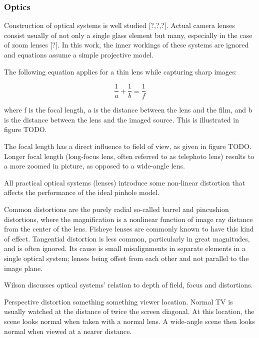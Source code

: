 \subsubsection{Optics}

Construction of optical systems is well studied [?,?,?]. Actual camera lenses consist usually of not only a single glass element but many, especially in the case of zoom lenses [?]. In this work, the inner workings of these systems are ignored and equations assume a simple projective model.

The following equation applies for a thin lens while capturing sharp images:

\begin{equation}
	\frac{1}{a} + \frac{1}{b} = \frac{1}{f} \label{eq:focal}
\end{equation}

where f is the focal length, a is the distance between the lens and the film, and b is the distance between the lens and the imaged source. This is illustrated in figure TODO.

The focal length has a direct influence to field of view, as given in figure TODO. Longer focal length (long-focus lens, often referred to as telephoto lens) results to a more zoomed in picture, as opposed to a wide-angle lens. 

All practical optical systems (lenses) introduce some non-linear distortion that affects the performance of the ideal pinhole model.

Common distortions are the purely radial so-called barrel and pincushion distortions, where the magnification is a nonlinear function of image ray distance from the center of the lens.
Fisheye lenses are commonly known to have this kind of effect.
Tangential distortion is less common, particularly in great magnitudes, and is often ignored. Its cause is small misalignments in separate elements in a single optical system; lenses being offset from each other and not parallel to the image plane.

Wilson \cite{wilson2004anton} discusses optical systems' relation to depth of field, focus and distortions.

Perspective distortion something something viewer location. Normal TV is usually watched at the distance of twice the screen diagonal. At this location, the scene looks normal when taken with a normal lens. A wide-angle scene then looks normal when viewed at a nearer distance. \cite{wilson2004anton}



